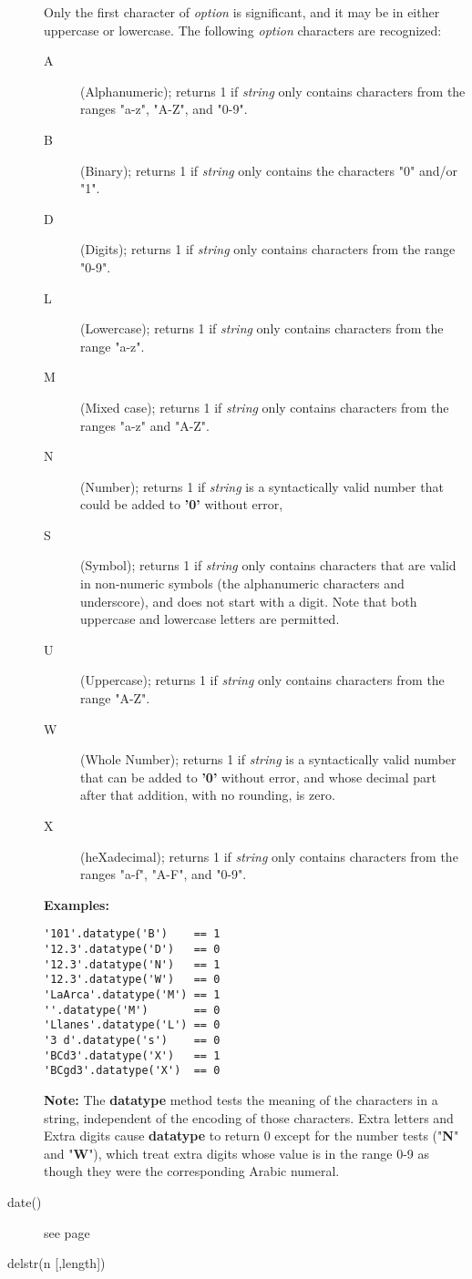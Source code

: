 \begin{description}
Only the first character of \emph{option} is significant, and it may
be in either uppercase or lowercase.
The following \emph{option} characters are recognized:
\begin{description}
\item[A]\label{refdta}
(Alphanumeric); returns 1 if \emph{string} only contains
characters from the ranges "a-z", "A-Z", and "0-9".
\item[B]\label{refdtb}
(Binary); returns 1 if \emph{string} only contains the
characters "0" and/or "1".
\item[D]\label{refdtd}
(Digits); returns 1 if \emph{string} only contains
characters from the range "0-9".
\item[L]\label{refdtl}
(Lowercase); returns 1 if \emph{string} only contains
characters from the range "a-z".
\item[M]\label{refdtm}
(Mixed case); returns 1 if \emph{string} only contains
characters from the ranges "a-z" and "A-Z".
\item[N]\label{refdtn}
(Number); returns 1 if \emph{string} is a syntactically valid
\nr{} number that could be added to \textbf{'0'} without error,
\item[S]\label{refdts}
(Symbol); returns 1 if \emph{string} only contains characters
that are valid in non-numeric symbols (the alphanumeric characters and
underscore), and does not start with a digit.  Note that both uppercase
and lowercase letters are permitted.
\item[U]\label{refdtu}
(Uppercase); returns 1 if \emph{string} only contains
characters from the range "A-Z".
\item[W]\label{refdtw}
(Whole Number); returns 1 if \emph{string} is a syntactically valid
\nr{} number that can be added to \textbf{'0'} without error, and
whose decimal part after that addition, with no rounding, is zero.
\item[X]\label{refdtx}
(heXadecimal); returns 1 if \emph{string} only contains
characters from the ranges "a-f", "A-F", and "0-9".
\end{description}
 
\textbf{Examples:}
\begin{lstlisting}
'101'.datatype('B')    == 1
'12.3'.datatype('D')   == 0
'12.3'.datatype('N')   == 1
'12.3'.datatype('W')   == 0
'LaArca'.datatype('M') == 1
''.datatype('M')       == 0
'Llanes'.datatype('L') == 0
'3 d'.datatype('s')    == 0
'BCd3'.datatype('X')   == 1
'BCgd3'.datatype('X')  == 0
\end{lstlisting}
\textbf{Note: }The \textbf{datatype} method tests the meaning of the characters
in a string, independent of the encoding of those characters.  Extra
letters and Extra digits cause \textbf{datatype} to return 0 except
for the number tests ("\textbf{N}" and "\textbf{W}"),
which treat extra digits whose value is in the range 0-9 as though they
were the corresponding Arabic numeral.
\item[date()] see page \pageref{refrexxdate}
\item[delstr(n [,length{]})]\label{refdelstr}


\end{description}
